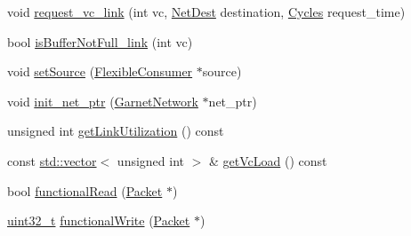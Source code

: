\begin{DoxyCompactItemize}
\item 
void \hyperlink{classNetworkLink_a947ef78a50126a1a6e2fa8008376aec1}{request\_\-vc\_\-link} (int vc, \hyperlink{classNetDest}{NetDest} destination, \hyperlink{classCycles}{Cycles} request\_\-time)
\item 
bool \hyperlink{classNetworkLink_a95c1b8c2bdac97a3881b0adc14774fa2}{isBufferNotFull\_\-link} (int vc)
\item 
void \hyperlink{classNetworkLink_aa12b98c270affe16e12b505ffba35e7c}{setSource} (\hyperlink{classFlexibleConsumer}{FlexibleConsumer} $\ast$source)
\item 
void \hyperlink{classNetworkLink_ab5da6a3c41f86ad2993eb11f4894ef00}{init\_\-net\_\-ptr} (\hyperlink{classGarnetNetwork}{GarnetNetwork} $\ast$net\_\-ptr)
\item 
unsigned int \hyperlink{classNetworkLink_a268a57ca669794bfa1abea88af8fe2f9}{getLinkUtilization} () const 
\item 
const \hyperlink{classstd_1_1vector}{std::vector}$<$ unsigned int $>$ \& \hyperlink{classNetworkLink_ac460400c34855ef93de2d591ba56f803}{getVcLoad} () const 
\item 
bool \hyperlink{classNetworkLink_a6db56c593ee28a561c47e75a859300dd}{functionalRead} (\hyperlink{classPacket}{Packet} $\ast$)
\item 
\hyperlink{Type_8hh_a435d1572bf3f880d55459d9805097f62}{uint32\_\-t} \hyperlink{classNetworkLink_aba9037f662122b5f2e85647d35670e5c}{functionalWrite} (\hyperlink{classPacket}{Packet} $\ast$)
\end{DoxyCompactItemize}
